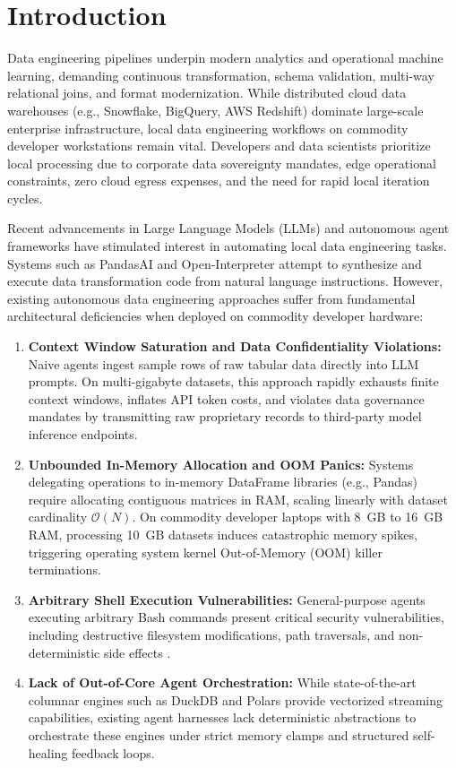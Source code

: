 \section{Introduction}
\label{sec:introduction}

Data engineering pipelines underpin modern analytics and operational machine learning, demanding continuous transformation, schema validation, multi-way relational joins, and format modernization. While distributed cloud data warehouses (e.g., Snowflake, BigQuery, AWS Redshift) dominate large-scale enterprise infrastructure, local data engineering workflows on commodity developer workstations remain vital. Developers and data scientists prioritize local processing due to corporate data sovereignty mandates, edge operational constraints, zero cloud egress expenses, and the need for rapid local iteration cycles.

Recent advancements in Large Language Models (LLMs) and autonomous agent frameworks \cite{yao2022react,schick2023toolformer} have stimulated interest in automating local data engineering tasks. Systems such as PandasAI \cite{pandas2023} and Open-Interpreter attempt to synthesize and execute data transformation code from natural language instructions. However, existing autonomous data engineering approaches suffer from fundamental architectural deficiencies when deployed on commodity developer hardware:
\begin{enumerate}
    \item \textbf{Context Window Saturation and Data Confidentiality Violations:} Naive agents ingest sample rows of raw tabular data directly into LLM prompts. On multi-gigabyte datasets, this approach rapidly exhausts finite context windows, inflates API token costs, and violates data governance mandates by transmitting raw proprietary records to third-party model inference endpoints.
    \item \textbf{Unbounded In-Memory Allocation and OOM Panics:} Systems delegating operations to in-memory DataFrame libraries (e.g., Pandas) require allocating contiguous matrices in RAM, scaling linearly with dataset cardinality $\mathcal{O}(N)$. On commodity developer laptops with 8~GB to 16~GB RAM, processing 10~GB datasets induces catastrophic memory spikes, triggering operating system kernel Out-of-Memory (OOM) killer terminations.
    \item \textbf{Arbitrary Shell Execution Vulnerabilities:} General-purpose agents executing arbitrary Bash commands present critical security vulnerabilities, including destructive filesystem modifications, path traversals, and non-deterministic side effects \cite{greshake2023not,liu2023jailbreaking,li2024evaluating}.
    \item \textbf{Lack of Out-of-Core Agent Orchestration:} While state-of-the-art columnar engines such as DuckDB \cite{raasveldt2023duckdb} and Polars \cite{polars2024} provide vectorized streaming capabilities, existing agent harnesses lack deterministic abstractions to orchestrate these engines under strict memory clamps and structured self-healing feedback loops.
\end{enumerate}

